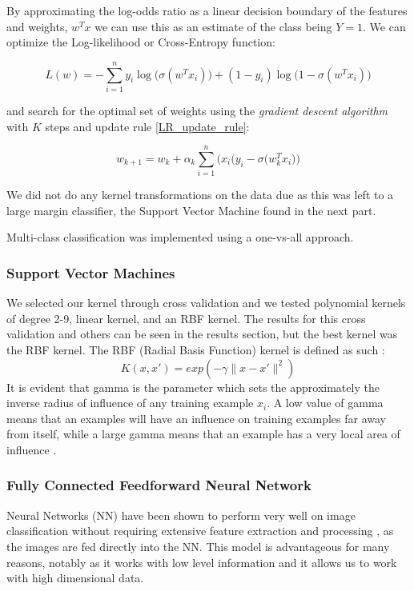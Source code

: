 \documentclass[conference]{IEEEtran}
\begin{document}
By approximating the log-odds ratio as a linear decision boundary of the features and weights, $w^T x$ we can use this as an estimate of the class being $Y=1$. We can optimize the Log-likelihood or Cross-Entropy function:

\begin{equation}
	\label{LL}
	L(w) = -\sum_{i=1}^n y_i\log\Big(\sigma(w^Tx_i)\Big) + (1-y_i)\log\Big(1-\sigma(w^Tx_i)\Big)
\end{equation}

and search for the optimal set of weights using the \emph{gradient descent algorithm} with $K$ steps and update rule \ref{LR_update_rule}:

\begin{equation}
\label{LR_update_rule}
	w_{k+1} = w_k + \alpha_k \sum_{i=1}^n \Big( x_i\big(y_i - \sigma(w_k^Tx_i\big) \Big)
\end{equation}

We did not do any kernel transformations on the data due as this was left to a large margin classifier, the Support Vector Machine found in the next part.

Multi-class classification was implemented using a one-vs-all approach.

\subsubsection{Support Vector Machines}
We selected our kernel through cross validation and we tested polynomial kernels of degree 2-9, linear kernel, and an RBF kernel. The results for this cross validation and others can be seen in the results section, but the best kernel was the RBF kernel. The RBF (Radial Basis Function) kernel is defined as such \cite{Hastie}: \[K(x,x\prime )=exp(-\gamma\|x-x\prime \|^2)\] It is evident that gamma is the parameter which sets the approximately the inverse radius of influence of any training example $x_i$. A low value of gamma means that an examples will have an influence on training examples far away from itself, while a large gamma means that an example has a very local area of influence \cite{sklearn}.


\subsubsection{Fully Connected Feedforward Neural Network}

Neural Networks (NN) have been shown to perform very well on image classification without requiring extensive feature extraction and processing \cite{LeCun90}, as the images are fed directly into the NN. This model is advantageous for many reasons, notably as it works with low level information and it allows us to work with high dimensional data.
\end{document}

